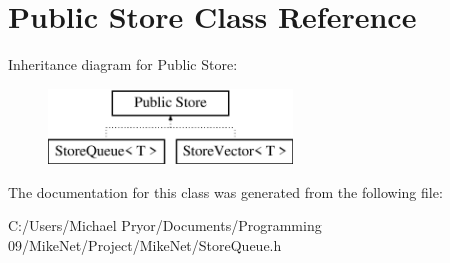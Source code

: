 \hypertarget{class_public_01_store}{
\section{Public Store Class Reference}
\label{class_public_01_store}
}
Inheritance diagram for Public Store:\begin{figure}[H]
\begin{center}
\leavevmode
\includegraphics[height=2.000000cm]{class_public_01_store}
\end{center}
\end{figure}


The documentation for this class was generated from the following file:\begin{DoxyCompactItemize}
\item 
C:/Users/Michael Pryor/Documents/Programming 09/MikeNet/Project/MikeNet/StoreQueue.h\end{DoxyCompactItemize}

